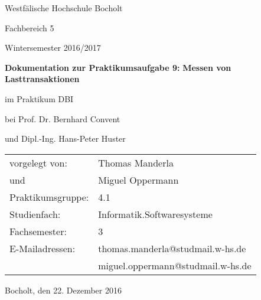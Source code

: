 \documentclass[a4paper, bibliography=totoc, 12pt]{scrartcl}
\begin{document}
\thispagestyle{empty}
	\begin{titlepage}
		\begin{center}
		
		Westfälische Hochschule Bocholt
		
		Fachbereich 5
				
		Wintersemester 2016/2017
		
		\vspace*{1cm}
		
		
		\vspace*{1.2cm}
		
		\LARGE \textbf{Dokumentation zur Praktikumsaufgabe 9:}
		\LARGE \textbf{Messen von Lasttransaktionen}
		
		\vspace*{0,1cm}
		
		\large im Praktikum \glqq DBI\grqq
		\vspace*{0,1cm}
		
		\large bei Prof. Dr. Bernhard Convent
		
		\large und Dipl.-Ing. Hans-Peter Huster
		
		\vspace*{0.7cm}
		
		\end{center}
	
	\vspace*{4cm} \normalsize
		\begin{tabular}{ll}
		
		vorgelegt von: &Thomas Manderla\\
		und&Miguel Oppermann\\
		Praktikumsgruppe: &4.1\\
		Studienfach: &Informatik.Softwaresysteme\\
		Fachsemester: &3\\
		E-Mailadressen: &thomas.manderla@studmail.w-hs.de\\
		&miguel.oppermann@studmail.w-hs.de\\
		
		\end{tabular}
		
	\vspace*{1cm}
	Bocholt, den 22. Dezember 2016	
	
	\end{titlepage}
	\thispagestyle{empty}
	
	\setcounter{tocdepth}{3}%
\tableofcontents \thispagestyle{empty}
\end{document}

